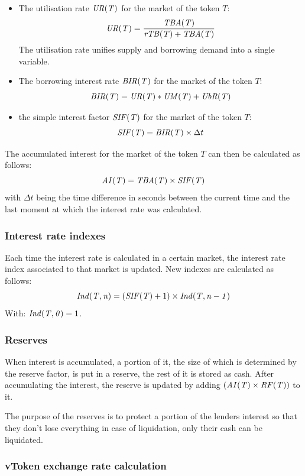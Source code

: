 \begin{itemize}
  \item The utilisation rate $\mathit{UR(T)}$ for the market of the token $T$:
  $$
    \mathit{UR(T)} = \frac{ \mathit{TBA(T)} }{ \mathit{rTB(T)} + \mathit{TBA(T)} }
  $$
  The utilisation rate unifies supply and borrowing demand into a single variable.
  \item The borrowing interest rate $\mathit{BIR(T)}$ for the market of the token $T$:
  $$
    \mathit{BIR(T)} = \mathit{UR(T)} * \mathit{UM(T)} + \mathit{UbR(T)}
  $$ %
  \item the simple interest factor $\mathit{SIF(T)}$ for the market of the token $T$:
  $$
    \mathit{SIF(T)} = \mathit{BIR(T)} \times \Delta t
  $$
\end{itemize}
The accumulated interest for the market of the token $T$ can then be calculated as follows:
$$
  \mathit{AI(T)} = \mathit{TBA(T)} \times \mathit{SIF(T)}
$$ %
with $\Delta t$ being the time difference in seconds between the current time and the last moment at which the interest rate was calculated.

\subsubsection{Interest rate indexes}

Each time the interest rate is calculated in a certain market, the interest rate index associated to that market is updated. New indexes are calculated as follows:
$$
\mathit{Ind(T, n)} = (\mathit{SIF(T)} + 1) \times\mathit{Ind(T, n-1)}
$$
With: $\mathit{Ind(T, 0)} = 1$.

\subsubsection{Reserves}

When interest is accumulated, a portion of it, the size of which is determined by the reserve factor, is put in a reserve, the rest of it is stored as cash. After accumulating the interest, the reserve is updated by adding $(\mathit{AI(T)} \times \mathit{RF(T)})$ to it.

The purpose of the reserves is to protect a portion of the lenders interest so that they don't lose everything in case of liquidation, only their cash can be liquidated. %

\subsubsection{vToken exchange rate calculation}

